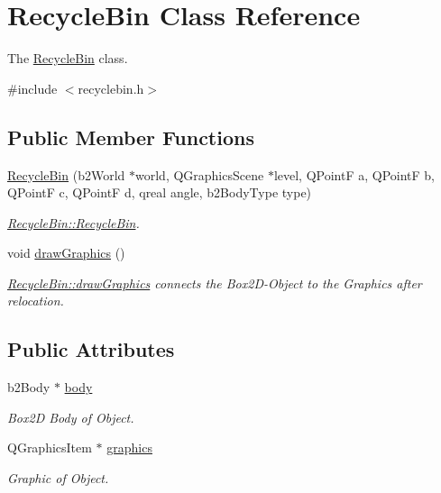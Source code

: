 \hypertarget{class_recycle_bin}{}\section{Recycle\+Bin Class Reference}
\label{class_recycle_bin}


The \hyperlink{class_recycle_bin}{Recycle\+Bin} class.  




{\ttfamily \#include $<$recyclebin.\+h$>$}

\subsection*{Public Member Functions}
\begin{DoxyCompactItemize}
\item 
\hyperlink{class_recycle_bin_aff0bd5474a5d05939b234d1d951e86e8}{Recycle\+Bin} (b2\+World $\ast$world, Q\+Graphics\+Scene $\ast$level, Q\+PointF a, Q\+PointF b, Q\+PointF c, Q\+PointF d, qreal angle, b2\+Body\+Type type)
\begin{DoxyCompactList}\small\item\em \hyperlink{class_recycle_bin_aff0bd5474a5d05939b234d1d951e86e8}{Recycle\+Bin\+::\+Recycle\+Bin}. \end{DoxyCompactList}\item 
void \hyperlink{class_recycle_bin_ab8158c4e18c16fb3e55638a60327d978}{draw\+Graphics} ()
\begin{DoxyCompactList}\small\item\em \hyperlink{class_recycle_bin_ab8158c4e18c16fb3e55638a60327d978}{Recycle\+Bin\+::draw\+Graphics} connects the Box2\+D-\/\+Object to the Graphics after relocation. \end{DoxyCompactList}\end{DoxyCompactItemize}
\subsection*{Public Attributes}
\begin{DoxyCompactItemize}
\item 
b2\+Body $\ast$ \hyperlink{class_recycle_bin_a1e0b25e04920ce7dc737549928d1f45a}{body}
\begin{DoxyCompactList}\small\item\em Box2D Body of Object. \end{DoxyCompactList}\item 
Q\+Graphics\+Item $\ast$ \hyperlink{class_recycle_bin_a876a38f5ba7524bd618c1c3749bb7a83}{graphics}
\begin{DoxyCompactList}\small\item\em Graphic of Object. \end{DoxyCompactList}\end{DoxyCompactItemize}


